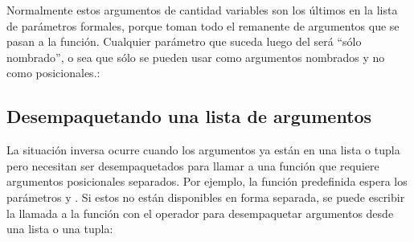 \documentclass[a5paper,10pt,spanish]{sphinxmanual}
\begin{document}
\sphinxAtStartPar
Normalmente estos argumentos de cantidad variables son los últimos en la lista de parámetros formales, porque toman todo el remanente de argumentos que se pasan a la función. Cualquier parámetro que suceda luego del  será “sólo nombrado”, o sea que sólo se pueden usar como argumentos nombrados y no como posicionales.:

\begin{sphinxVerbatim}[commandchars=\\\{\}]
  
     
  
   
\end{sphinxVerbatim}


\subsection{Desempaquetando una lista de argumentos}
\label{\detokenize{tutorial/controlflow:unpacking-argument-lists}}\label{\detokenize{tutorial/controlflow:tut-unpacking-arguments}}
\sphinxAtStartPar
La situación inversa ocurre cuando los argumentos ya están en una lista o tupla pero necesitan ser desempaquetados para llamar a una función que requiere argumentos posicionales separados. Por ejemplo, la función predefinida  espera los parámetros  y . Si estos no están disponibles en forma separada, se puede escribir la llamada a la función con el operador \sphinxcode{\sphinxupquote{*}} para desempaquetar argumentos desde una lista o una tupla:
\end{document}
